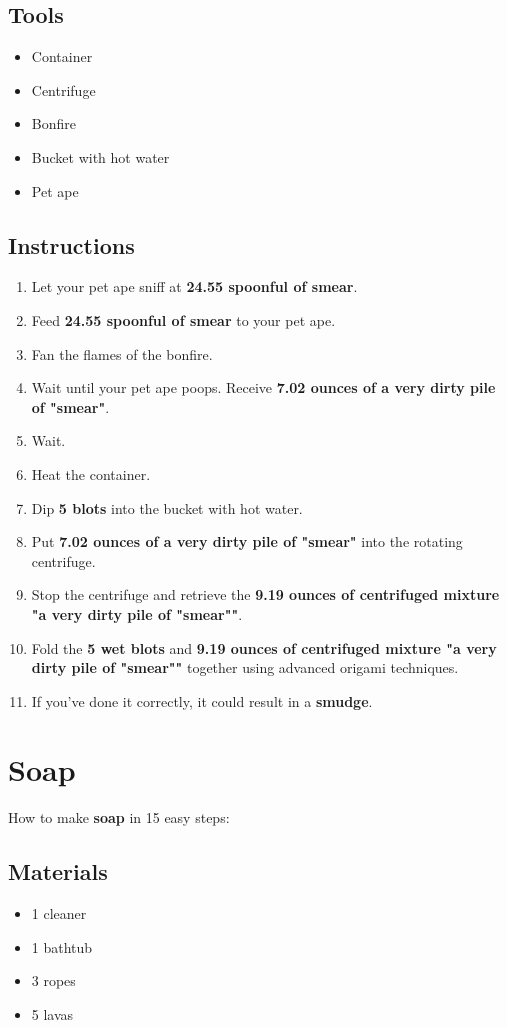 \documentclass{article}
\begin{document}
\subsection{Tools}\begin{itemize}
\item 
Container
\item 
Centrifuge
\item 
Bonfire
\item 
Bucket with hot water
\item 
Pet ape
\end{itemize}
\subsection{Instructions}\begin{enumerate}
\item 
Let your pet ape sniff at \textbf{24.55 spoonful of smear}.
\item 
Feed \textbf{24.55 spoonful of smear} to your pet ape.
\item 
Fan the flames of the bonfire.
\item 
Wait until your pet ape poops. Receive \textbf{7.02 ounces of a very dirty pile of "smear"}.
\item 
Wait.
\item 
Heat the container.
\item 
Dip \textbf{5 blots} into the bucket with hot water.
\item 
Put \textbf{7.02 ounces of a very dirty pile of "smear"} into the rotating centrifuge.
\item 
Stop the centrifuge and retrieve the \textbf{9.19 ounces of centrifuged mixture "a very dirty pile of "smear""}.
\item 
Fold the \textbf{5 wet blots} and \textbf{9.19 ounces of centrifuged mixture "a very dirty pile of "smear""} together using advanced origami techniques.
\item 
If you've done it correctly, it could result in a \textbf{smudge}.
\end{enumerate}
\newpage
\section{Soap}How to make \textbf{soap} in 15 easy steps:

\subsection{Materials}\begin{itemize}
\item 
1 cleaner
\item 
1 bathtub
\item 
3 ropes
\item 
5 lavas
\end{itemize}
\end{document}
